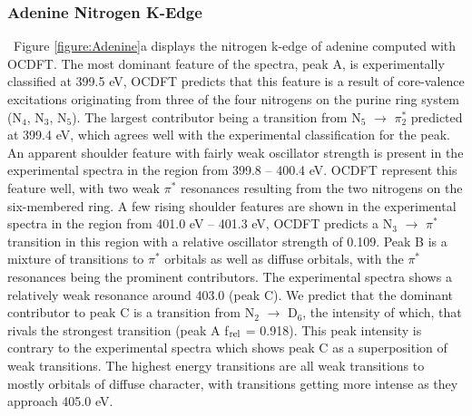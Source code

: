 \documentclass[12pt]{article}
\begin{document}
\subsubsection{Adenine Nitrogen K-Edge}
   \ Figure \ref{figure:Adenine}a displays the nitrogen k-edge of adenine computed with OCDFT. The most dominant feature of the spectra, peak A, is experimentally classified at 399.5 eV, OCDFT predicts that this feature is a result of core-valence excitations originating from three of the four nitrogens on the purine ring system (N$_4$, N$_3$, N$_5$). The largest contributor being a transition from N$_5$ $\rightarrow$ $\pi_2^*$ predicted at 399.4 eV, which agrees well with the experimental classification for the peak. An apparent shoulder feature with fairly weak oscillator strength is present in the experimental spectra in the region from 399.8 -- 400.4 eV. OCDFT represent this feature well, with two weak $\pi^*$ resonances resulting from the two nitrogens on the six-membered ring. A few rising shoulder features are shown in the experimental spectra in the region from 401.0 eV -- 401.3 eV, OCDFT predicts a N$_3$ $\rightarrow$ $\pi^*$ transition in this region with a relative oscillator strength of 0.109. Peak B is a mixture of transitions to $\pi^*$ orbitals as well as diffuse orbitals, with the $\pi^*$ resonances being the prominent contributors. 
The experimental spectra shows a relatively weak resonance around 403.0 (peak C).  We predict that the dominant contributor to peak C is a transition from N$_2$ $\rightarrow$ D$_6$, the intensity of which, that rivals the strongest transition (peak A f$_{\rm rel}$ = 0.918). This peak intensity is contrary to the experimental spectra which shows peak C  as a superposition of weak transitions. The highest energy transitions are all weak transitions to mostly orbitals of diffuse character, with transitions getting more intense as they approach 405.0 eV. 
\end{document}
